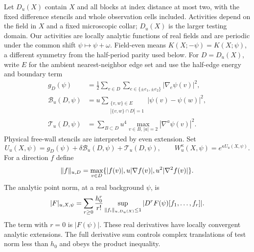 Let \(D_u(X)\) contain \(X\) and all blocks at index distance at
most two, with the fixed difference stencils and whole observation
cells included.  Activities depend on the field in \(X\) and a
fixed microscopic collar; \(D_u(X)\) is the larger testing domain.
Our activities are locally analytic functions of real fields and are
periodic under the common shift \(\psi\mapsto\psi+\omega\).
Field-even means \(K(X;-\psi)=K(X;\psi)\), a different symmetry
from the half-period parity used below.
For \(D=D_u(X)\), write \(E\) for the ambient nearest-neighbor
edge set and use the half-edge energy and boundary term
\begin{align*}
 g_D(\psi)&=\frac12\sum_{v\in D}\sum_{e\in\{\pm e_1,\pm e_2\}}
                                      |\nabla_e\psi(v)|^2,\\
 \mathcal B_u(D,\psi)&=u\sum_{\substack{\{v,w\}\in E\\|\{v,w\}\cap D|=1}}
                                             |\psi(v)-\psi(w)|^2,\\
 \mathcal T_u(D,\psi)&=\sum_{B\subset D}u^4
                     \max_{v\in B,\,|a|=2}|\nabla^a\psi(v)|^2.
\end{align*}
Physical free-wall stencils are interpreted by even extension.
Set
\[
 U_u(X,\psi)=g_D(\psi)+\delta\mathcal B_u(D,\psi)
                      +\mathcal T_u(D,\psi),\qquad
 W_u^\kappa(X,\psi)=e^{\kappa U_u(X,\psi)}.
\]
For a direction \(f\) define
\[
 \lVert f\rVert_{u,D}=\max_{v\in D}
                 \{|f(v)|,u|\nabla f(v)|,u^2|\nabla^2f(v)|\}.
\]
The analytic point norm, at a real background \(\psi\), is
\begin{equation}\label{inp:point-norm}
 |F|_{u,X,\psi}=
 \sum_{r\ge0}\frac{h_0^r}{r!}
 \sup_{\lVert f_i\rVert_{u,D_u(X)}\le1}
             |D^rF(\psi)[f_1,\ldots,f_r]|.
\end{equation}
The term with \(r=0\) is \(|F(\psi)|\).  These real derivatives
have locally convergent analytic extensions.  The full derivative
sum controls complex translations of test norm less than \(h_0\)
and obeys the product inequality.

